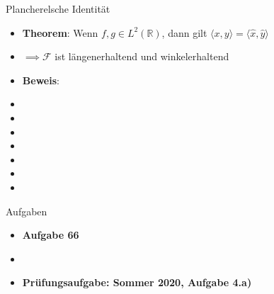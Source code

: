 \documentclass[14pt, aspectratio=169, handout]{beamer}
\begin{document}
\begin{frame}{Plancherelsche Identität}
    \begin{itemize}
    \item \textbf{Theorem}: Wenn $f,g \in L^2(\mathbb{R})$, dann gilt $\langle x, y\rangle = \langle \hat{x}, \hat{y}\rangle$
    \item[] $\implies \mathcal{F}$ ist längenerhaltend und winkelerhaltend
    \item \textbf{Beweis}:
    \item[]
    \item[]
    \item[]
    \item[]
    \item[]
    \item[]
    \item[]
\end{itemize}
\end{frame}

\begin{frame}{Aufgaben}
    \begin{itemize}
        \item \textbf{Aufgabe 66}
        \item[]
        \item \textbf{Prüfungsaufgabe: Sommer 2020, Aufgabe 4.a)}
    \end{itemize}
\end{frame}
\end{document}
